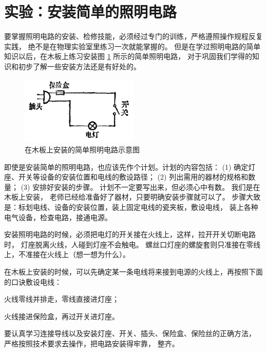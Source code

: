 \section{实验：安装简单的照明电路}\label{sec:11-5}

要掌握照明电路的安装、检修技能，必须经过专门的训练，严格遵照操作规程反复实践，
绝不是在物理实验室里练习一次就能掌握的。
但是在学过照明电路的简单知识以后，在木板上练习安装图 \ref{fig:11-11} 所示的简单照明电路，
对于巩固我们学得的知识和初步了解一些安装方法还是有好处的。

\begin{figure}[htbp]
    \centering
    \includegraphics[width=0.5\textwidth]{../pic/czwl2-ch11-11}
    \caption{在木板上安装的简单照明电路示意图}\label{fig:11-11}
\end{figure}

即使是安装简单的照明电路，也应该先作个计划。计划的内容包括：
(1) 确定灯座、开关等设备的安装位置和电线的敷设路径；
(2) 列出需用的器材的规格和数量；
(3) 安排好安装的步骤。
计划不一定要写出来，但必须心中有数。
我们是在木板上安装， 老师已经给准备好了器材，只要明确安装步骤就可以了。
步骤大致是：标划电线、设备的安装位置，装上固定电线的瓷夹板，敷设电线，
装上各种电气设备，检查电路，接通电源。

安装照明电路的时候，必须把电灯的开关接在火线上，这样，拉开开关切断电路时，
灯座脱离火线，人碰到灯座不会触电。
螺丝口灯座的螺旋套则只准接在零线上，不准接在火线上（想一想为什么）。

在木板上安装的时候，可以先确定某一条电线将来接到电源的火线上，再按照下面的口诀敷设电线：

\vspace{-1em}
\begin{center}
    火线零线并排走，\qquad 零线直接进灯座；

    火线接进保险盒，\qquad 再过开关进灯座。
\end{center}

\vspace{-1em}
要认真学习连接导线以及安装灯座、开关、插头、保险盒、保险丝的正确方法，
严格按照技术要求去操作，把电路安装得牢靠， 整齐。

